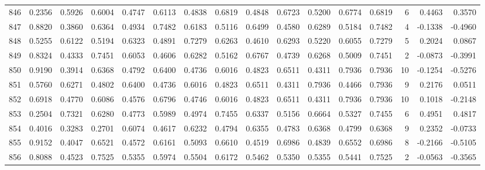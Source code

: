 \begin{tabular}{lrrrrrrrrrrrrrrr}
846 &      0.2356 &  0.5926 &  0.6004 &  0.4747 &  0.6113 &  0.4838 &  0.6819 &  0.4848 &  0.6723 &  0.5200 &   0.6774 &     0.6819 &      6 &                    0.4463 &                     0.3570 \\
847 &      0.8820 &  0.3860 &  0.6364 &  0.4934 &  0.7482 &  0.6183 &  0.5116 &  0.6499 &  0.4580 &  0.6289 &   0.5184 &     0.7482 &      4 &                   -0.1338 &                    -0.4960 \\
848 &      0.5255 &  0.6122 &  0.5194 &  0.6323 &  0.4891 &  0.7279 &  0.6263 &  0.4610 &  0.6293 &  0.5220 &   0.6055 &     0.7279 &      5 &                    0.2024 &                     0.0867 \\
849 &      0.8324 &  0.4333 &  0.7451 &  0.6053 &  0.4606 &  0.6282 &  0.5162 &  0.6767 &  0.4739 &  0.6268 &   0.5009 &     0.7451 &      2 &                   -0.0873 &                    -0.3991 \\
850 &      0.9190 &  0.3914 &  0.6368 &  0.4792 &  0.6400 &  0.4736 &  0.6016 &  0.4823 &  0.6511 &  0.4311 &   0.7936 &     0.7936 &     10 &                   -0.1254 &                    -0.5276 \\
851 &      0.5760 &  0.6271 &  0.4802 &  0.6400 &  0.4736 &  0.6016 &  0.4823 &  0.6511 &  0.4311 &  0.7936 &   0.4466 &     0.7936 &      9 &                    0.2176 &                     0.0511 \\
852 &      0.6918 &  0.4770 &  0.6086 &  0.4576 &  0.6796 &  0.4746 &  0.6016 &  0.4823 &  0.6511 &  0.4311 &   0.7936 &     0.7936 &     10 &                    0.1018 &                    -0.2148 \\
853 &      0.2504 &  0.7321 &  0.6280 &  0.4773 &  0.5989 &  0.4974 &  0.7455 &  0.6337 &  0.5156 &  0.6664 &   0.5327 &     0.7455 &      6 &                    0.4951 &                     0.4817 \\
854 &      0.4016 &  0.3283 &  0.2701 &  0.6074 &  0.4617 &  0.6232 &  0.4794 &  0.6355 &  0.4783 &  0.6368 &   0.4799 &     0.6368 &      9 &                    0.2352 &                    -0.0733 \\
855 &      0.9152 &  0.4047 &  0.6521 &  0.4572 &  0.6161 &  0.5093 &  0.6610 &  0.4519 &  0.6986 &  0.4839 &   0.6552 &     0.6986 &      8 &                   -0.2166 &                    -0.5105 \\
856 &      0.8088 &  0.4523 &  0.7525 &  0.5355 &  0.5974 &  0.5504 &  0.6172 &  0.5462 &  0.5350 &  0.5355 &   0.5441 &     0.7525 &      2 &                   -0.0563 &                    -0.3565 \\

\end{tabular}

